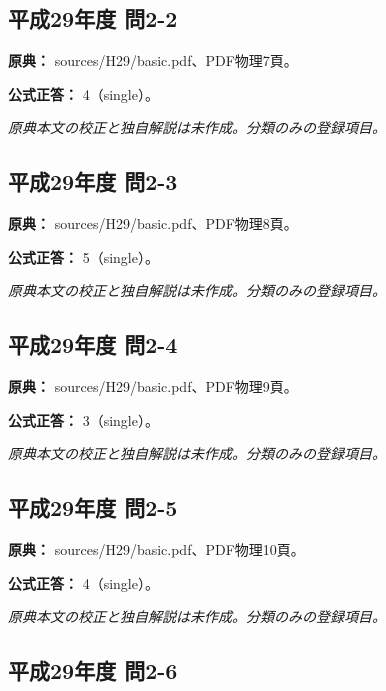 \subsection{平成29年度 問2-2}
\label{q:h29-reg-basic-2-2}

\noindent\textbf{原典：} sources/H29/basic.pdf、PDF物理7頁。

\textbf{公式正答：} 4（single）。

\par\textit{原典本文の校正と独自解説は未作成。分類のみの登録項目。}

\subsection{平成29年度 問2-3}
\label{q:h29-reg-basic-2-3}

\noindent\textbf{原典：} sources/H29/basic.pdf、PDF物理8頁。

\textbf{公式正答：} 5（single）。

\par\textit{原典本文の校正と独自解説は未作成。分類のみの登録項目。}

\subsection{平成29年度 問2-4}
\label{q:h29-reg-basic-2-4}

\noindent\textbf{原典：} sources/H29/basic.pdf、PDF物理9頁。

\textbf{公式正答：} 3（single）。

\par\textit{原典本文の校正と独自解説は未作成。分類のみの登録項目。}

\subsection{平成29年度 問2-5}
\label{q:h29-reg-basic-2-5}

\noindent\textbf{原典：} sources/H29/basic.pdf、PDF物理10頁。

\textbf{公式正答：} 4（single）。

\par\textit{原典本文の校正と独自解説は未作成。分類のみの登録項目。}

\subsection{平成29年度 問2-6}
\label{q:h29-reg-basic-2-6}

